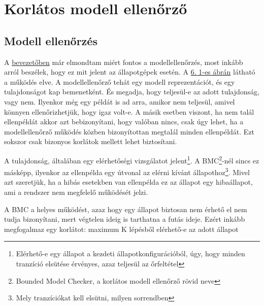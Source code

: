 \chapter{Korlátos modell ellenőrző}
\label{sec:bmc}
\section{Modell ellenőrzés}
A \hyperref[sec:intro]{bevezetőben} már elmondtam miért fontos a modellellenőrzés, most inkább arról beszélek, hogy ez mit jelent az állapotgépek esetén. A \hyperref[fig:mcheck]{6. 1-es ábrán} látható a működés elve. A modellellenőrző tehát egy modell reprezentációt, és egy tulajdonságot kap bemenetként. És megadja, hogy teljesül-e az adott tulajdonság, vagy nem. Ilyenkor még egy példát is ad arra, amikor nem teljesül, amivel könnyen ellenőrizhetjük, hogy igaz volt-e. A másik esetben viszont, ha nem talál ellenpéldát akkor azt bebizonyítani, hogy valóban nincs, csak úgy lehet, ha a modellellenőrző működés közben bizonyítottan megtalál minden ellenpéldát. Ezt sokszor csak bizonyos korlátok mellett lehet biztosítani.

A tulajdonság, általában egy elérhetőségi vizsgálatot jelent\footnote{Elérhető-e egy állapot a kezdeti állapotkonfigurációból, úgy, hogy minden tranzíció elsütése érvényes, azaz teljesül az őrfeltétel}. A BMC\footnote{Bounded Model Checker, a korlátos modell ellenőrző rövid neve}-nél sincs ez másképp, ilyenkor az ellenpélda egy útvonal az elérni kívánt állapothoz\footnote{Mely tranzíciókat kell elsütni, milyen sorrendben}. Mivel azt szeretjük, ha a hibás esetekben van ellenpélda ez az állapot egy hibaállapot, ami a rendszer nem megfelelő működését jelzi.

A BMC a helyes működést, azaz hogy egy állapot biztosan nem érhető el nem tudja bizonyítani, mert végtelen ideig is tarthatna a futás ideje. Ezért inkább megfogalmaz egy korlátot: maximum K lépésből elérhető-e az adott állapot

